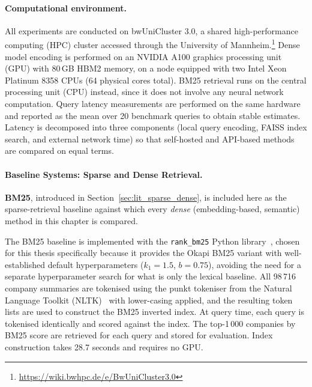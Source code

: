 \documentclass[a4paper,oneside,bibliography=totoc]{scrbook}
\begin{document}
\label{subsec:quality}
\paragraph{Computational environment.}
\label{subsec:compute}

All experiments are conducted on bwUniCluster 3.0, a shared high-performance computing (HPC) cluster accessed through the University of Mannheim.\footnote{\url{https://wiki.bwhpc.de/e/BwUniCluster3.0}} Dense model encoding is performed on an NVIDIA A100 graphics processing unit (GPU) with 80\,GB HBM2 memory, on a node equipped with two Intel Xeon Platinum 8358 CPUs (64 physical cores total). BM25 retrieval runs on the central processing unit (CPU) instead, since it does not involve any neural network computation. Query latency measurements are performed on the same hardware and reported as the mean over 20 benchmark queries to obtain stable estimates. Latency is decomposed into three components (local query encoding, FAISS index search, and external network time) so that self-hosted and API-based methods are compared on equal terms.

\paragraph{Baseline Systems: Sparse and Dense Retrieval.}
\label{sec:baseline_sparse}

\textbf{BM25}, introduced in Section~\ref{sec:lit_sparse_dense}, is included here as the sparse-retrieval baseline against which every \emph{dense} (embedding-based, semantic) method in this chapter is compared.
\label{subsec:bm25_impl}

The BM25 baseline is implemented with the \texttt{rank\_bm25} Python library~\citep{robertson2009probabilistic}, chosen for this thesis specifically because it provides the Okapi BM25 variant with well-established default hyperparameters ($k_1 = 1.5$, $b = 0.75$), avoiding the need for a separate hyperparameter search for what is only the lexical baseline. All 98\,716 company summaries are tokenised using the punkt tokeniser from the Natural Language Toolkit (NLTK)~\citep{nltk} with lower-casing applied, and the resulting token lists are used to construct the BM25 inverted index. At query time, each query is tokenised identically and scored against the index. The top-1\,000 companies by BM25 score are retrieved for each query and stored for evaluation. Index construction takes 28.7 seconds and requires no GPU.
\end{document}
